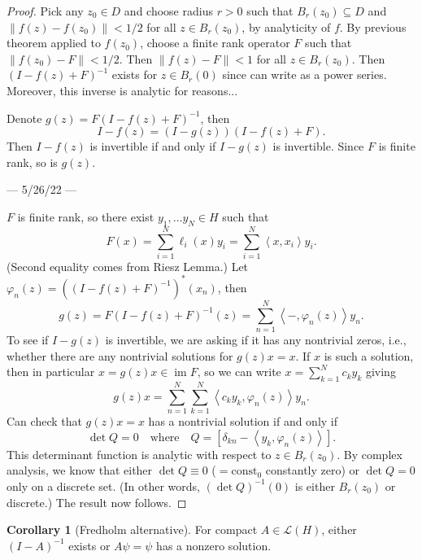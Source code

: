 \documentclass[12pt]{article}
\theoremstyle{definition}
\newtheorem{corollary}{Corollary}
\newcommand{\isp}[1]{\quad\text{#1}\quad}
\newcommand{\LL}{\mathcal{L}}
\renewcommand{\phi}{\varphi}
\newcommand{\<}{\left\langle}
\renewcommand{\>}{\right\rangle}
\newcommand{\seq}{\subseteq}
\DeclareMathOperator{\im}{im}
\begin{document}
\begin{proof}
    Pick any $z_0 \in D$ and choose radius $r > 0$ such that $B_r(z_0) \seq D$ and $\|f(z) - f(z_0)\| < 1/2$ for all $z \in B_r(z_0)$, by analyticity of $f$.
    By previous theorem applied to $f(z_0)$, choose a finite rank operator $F$ such that $\|f(z_0) - F\| < 1/2$.
    Then $\|f(z) - F\| < 1$ for all $z \in B_r(z_0)$.
    Then $(I - f(z) + F)^{-1}$ exists for $z \in B_r(0)$ since can write as a power series.
    Moreover, this inverse is analytic for reasons...

    Denote $g(z) = F(I - f(z) + F)^{-1}$, then
    \[
        I - f(z) = (I - g(z))(I - f(z) + F).
    \]
    Then $I - f(z)$ is invertible if and only if $I - g(z)$ is invertible.
    Since $F$ is finite rank, so is $g(z)$.

    \begin{center}
        --- 5/26/22 ---
    \end{center}

    $F$ is finite rank, so there exist $y_1, \dots y_N \in H$ such that
    \[
        F(x)
            = \sum_{i=1}^{N} \ell_i(x)y_i
            = \sum_{i=1}^{N} \<x, x_i\>y_i.
    \]
    (Second equality comes from Riesz Lemma.)
    Let $\phi_n(z) = ((I - f(z) + F)^{-1})^*(x_n)$, then
    \[
        g(z)
            = F(I - f(z) + F)^{-1}(z)
            = \sum_{n=1}^{N} \<-, \phi_n(z)\>y_n.
    \]
    To see if $I - g(z)$ is invertible, we are asking if it has any nontrivial zeros, i.e., whether there are any nontrivial solutions for $g(z)x = x$.
    If $x$ is such a solution, then in particular $x = g(z)x \in \im F$, so we can write $x = \sum_{k=1}^{N} c_k y_k$ giving
    \[
        g(z)x
            = \sum_{n=1}^{N} \sum_{k=1}^{N} \<c_k y_k, \phi_n(z)\>y_n.
    \]
    Can check that $g(z)x = x$ has a nontrivial solution if and only if
    \[
        \det Q = 0 \isp{where} Q = [\delta_{kn} - \<y_k, \phi_n(z)\>].
    \]
    This determinant function is analytic with respect to $z \in B_r(z_0)$.
    By complex analysis, we know that either $\det Q \equiv 0$ ($=\mathrm{const_0}$ constantly zero) or $\det Q = 0$ only on a discrete set.
    (In other words, $(\det Q)^{-1}(0)$ is either $B_r(z_0)$ or discrete.)
    The result now follows.
\end{proof}

\begin{corollary}[Fredholm alternative]
    For compact $A \in \LL(H)$, either $(I - A)^{-1}$ exists or $A\psi = \psi$ has a nonzero solution.
\end{corollary}
\end{document}

